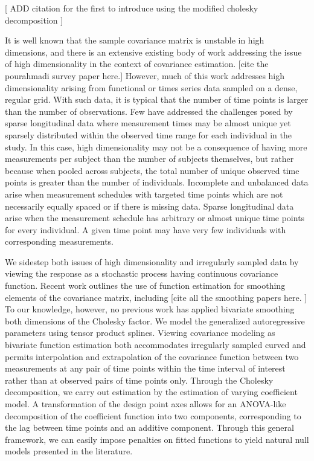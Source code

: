 \documentclass[12pt]{article}
\theoremstyle{definition}
\begin{document}
[ ADD citation for the first to introduce using the modified cholesky decomposition ]

It is well known that the sample covariance matrix is unstable in high dimensions, and there is an extensive existing body of work addressing the issue of high dimensionality in the context of covariance estimation. [cite the pourahmadi survey paper here.] However, much of this work addresses high dimensionality arising from functional or times series data sampled on a dense, regular grid. With such data, it is typical that the number of time points is larger than the number of observations. Few have addressed the challenges posed by sparse longitudinal data where measurement times may be almost unique yet sparsely distributed within the observed time range for each individual in the study. In this case, high dimensionality may not be a consequence of having more measurements per subject than the number of subjects themselves, but rather because when pooled across subjects, the total number of unique observed time points is greater than the number of individuals. Incomplete and unbalanced data arise when measurement schedules with targeted time points which are not necessarily equally spaced or if there is missing data. Sparse longitudinal data arise when the measurement schedule has arbitrary or almost unique time points for every individual. A given time point may have very few individuals with corresponding measurements. 

We sidestep both issues of high dimensionality and irregularly sampled data by viewing the response as a stochastic process having continuous covariance function. Recent work outlines the use of function estimation for smoothing elements of the covariance matrix, including [cite all the smoothing papers here. ] To our knowledge, however, no previous work has applied bivariate smoothing both dimensions of the Cholesky factor. We model the generalized autoregressive parameters using tensor product splines. Viewing covariance modeling as bivariate function estimation both accommodates irregularly sampled curved and permits interpolation and extrapolation of the covariance function between two measurements at any pair of time points within the time interval of interest rather than at observed pairs of time points only. Through the Cholesky decomposition, we carry out estimation by the estimation of varying coefficient model. A transformation of the design point axes allows for an ANOVA-like decomposition of the coefficient function into two components, corresponding to the lag between time points and an additive component. Through this general framework, we can easily impose penalties on fitted functions to yield natural null models presented in the literature. 
\end{document}
